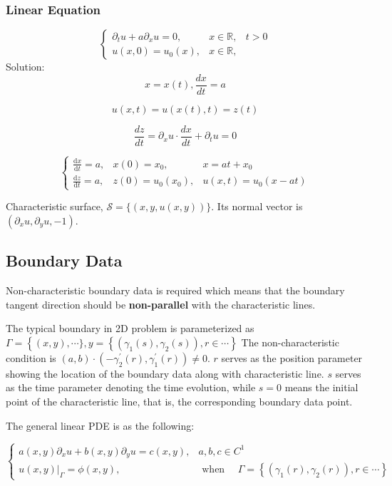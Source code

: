 \subsubsection{Linear Equation}
\begin{example}
\begin{equation}
\left\{\begin{matrix}
	\partial_t u+a\partial_x u=0, &x\in \mathbb{R},  & t>0 \\ 
	u(x,0)=u_0(x), & x\in \mathbb{R}, & 
	\end{matrix}\right.
\end{equation}
Solution: $$x=x(t), \frac{dx}{dt}=a$$

$$u(x,t)=u(x(t),t)=z(t)$$

$$\frac{dz}{dt}=\partial_x u\cdot \frac{dx}{dt}+\partial_t u=0$$

$$
\left\{\begin{matrix}
\frac{\mathrm{d} x}{\mathrm{d} t}=a, &x(0)=x_0 ,  & x=at+x_0\\ 
\frac{\mathrm{d} z}{\mathrm{d} t}=a, & z(0)=u_0(x_0), & u(x,t)=u_0(x-at) 
\end{matrix}\right.
$$


\end{example}

Characteristic surface, $\mathcal{S}=\{(x, y, u(x, y))\}$. Its normal vector is $(\partial_x u, \partial_y u, -1)$.
\subsection{Boundary Data}
Non-characteristic boundary data is required which means that the boundary tangent direction should be \textbf{non-parallel} with the characteristic lines.

The typical boundary in 2D problem is parameterized as $\Gamma=\left\{(x, y), \cdots\},  y=\left\{\left(\gamma_{1}(s), \gamma_{2}(s)\right), r\in\cdots\right\}\right.$ The non-characteristic condition is $(a, b) \cdot\left(-\gamma_{2}^{\prime}(r), \gamma_{1}^{\prime}(r)\right) \neq 0$. $r$ serves as the position parameter showing the location of the boundary data along with characteristic line. $s$ serves as the time parameter denoting the time evolution, while $s=0$ means the initial point of the characteristic line, that is, the corresponding boundary data point.

The general linear PDE is as the following:

\begin{equation}
\left\{\begin{matrix}
a(x, y) \partial_{x} u+b(x, y) \partial_y u=c(x, y), &a, b, c \in C^{1} \\ 
\left.u(x, y)\right|_{\Gamma}=\phi(x, y), \quad &\text { when } \quad \Gamma=\left\{\left(\gamma_{1}(r), \gamma_{2}(r)\right), r \in \cdots\right\}
\end{matrix}\right.
\end{equation}

